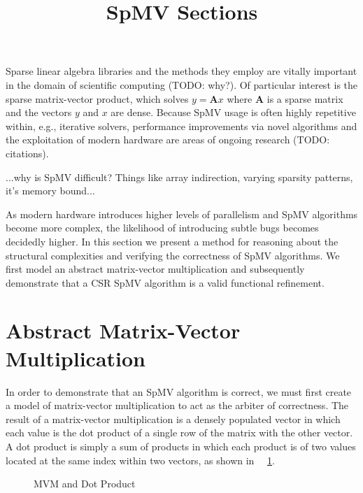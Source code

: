\documentclass[sigconf]{acmart}
\begin{document}
\pagestyle{plain}
\title{SpMV Sections}
\maketitle

Sparse linear algebra libraries and the methods they employ are vitally important in the domain of scientific computing (TODO: why?).  Of particular interest is the sparse matrix-vector product, which solves $y = \bm{A}x$ where $\bm{A}$ is a sparse matrix and the vectors $y$ and $x$ are dense.  Because SpMV usage is often highly repetitive within, e.g., iterative solvers, performance improvements via novel algorithms and the exploitation of modern hardware are areas of ongoing research (TODO: citations).

...why is SpMV difficult? Things like array indirection, varying sparsity patterns, it's memory bound...

As modern hardware introduces higher levels of parallelism and SpMV algorithms become more complex, the likelihood of introducing subtle bugs becomes decidedly higher.  In this section we present a method for reasoning about the structural complexities and verifying the correctness of SpMV algorithms.  We first model an abstract matrix-vector multiplication and subsequently demonstrate that a CSR SpMV algorithm is a valid functional refinement.

\section{Abstract Matrix-Vector Multiplication}

In order to demonstrate that an SpMV algorithm is correct, we must first create a model of matrix-vector multiplication to act as the arbiter of correctness.  The result of a matrix-vector multiplication is a densely populated vector in which each value is the dot product of a single row of the matrix with the other vector.  A dot product is simply a sum of products in which each product is of two values located at the same index within two vectors, as shown in ~\figurename~\ref{fig:mvm}.

\begin{figure}

\caption{MVM and Dot Product}
\label{fig:mvm}
\end{figure}


\end{document}
